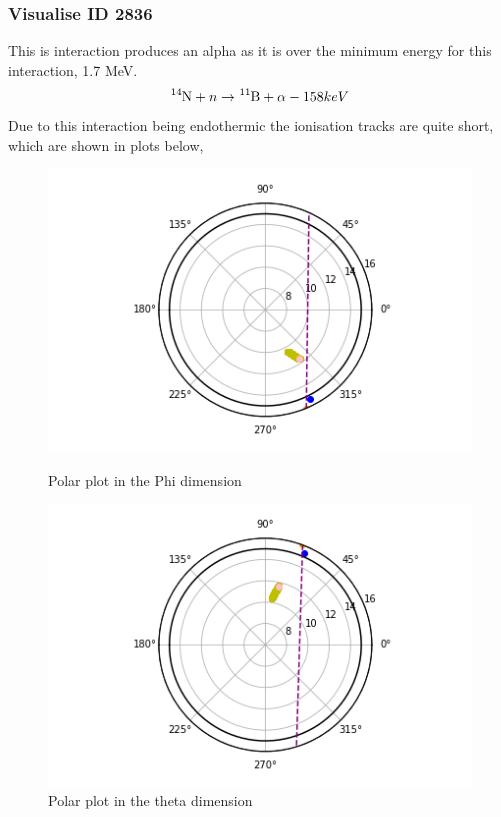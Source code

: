 \documentclass[a4paper]{article}
\begin{document}
\subsubsection{Visualise ID 2836}
This is interaction produces an alpha as it is over the minimum energy for this interaction, 1.7 MeV. 
\begin{equation}
    \ce{^{14}N} + n \rightarrow \ce{^{11}B} + \alpha - 158keV
\end{equation}
\noindent Due to this interaction being endothermic the ionisation tracks are quite short, which are shown in plots below,
\begin{figure}[H]
    \centering
    \begin{minipage}{.5\textwidth}
        \centering
        \includegraphics[width=1\linewidth]{Fast/2836_phi.png}
        \caption{Polar plot in the Phi dimension}
        \label{fig:prob1_6_2}
    \end{minipage}%
    \begin{minipage}{0.5\textwidth}
        \centering
        \includegraphics[width=1\linewidth]{Fast/2836_theta.png}
        \caption{Polar plot in the theta dimension}
        \label{fig:prob1_6_1}
    \end{minipage}
\end{figure}
\end{document}
